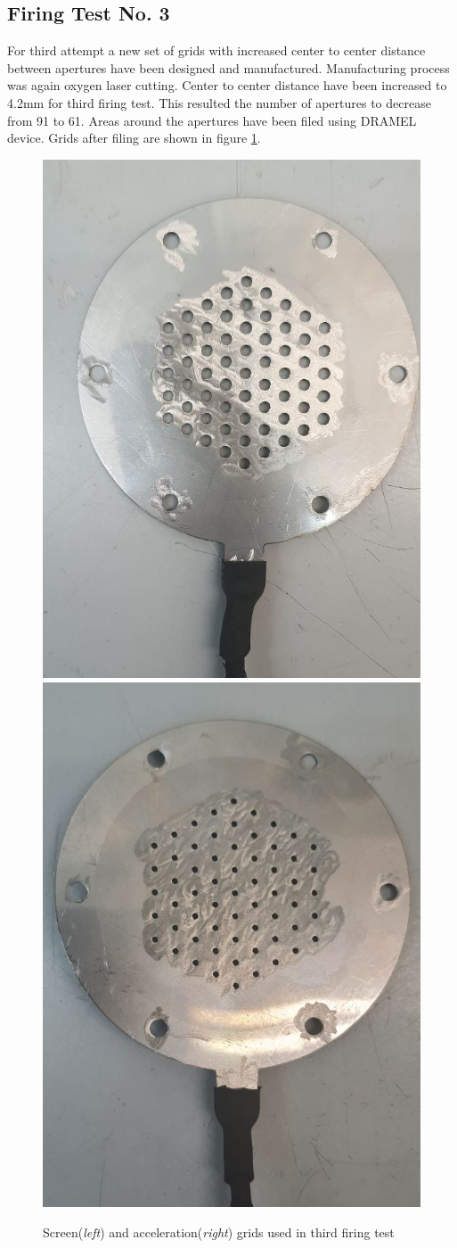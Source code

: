 \newpage
\subsection{Firing Test No. 3}
For third attempt a new set of grids with increased center to center distance between apertures have been designed and manufactured. Manufacturing process was again oxygen laser cutting. Center to center distance have been increased to 4.2mm for third firing test. This resulted the number of apertures to decrease from 91 to 61. Areas around the apertures have been filed using DRAMEL device. Grids after filing are shown in figure \ref{fig:3rd_grids_before}.

\begin{figure}[ht]
    \centering
    \includegraphics[width=0.41\linewidth]{fig/deneme3/test3_screen_before.jpeg}
    \includegraphics[width=0.4\linewidth]{fig/deneme3/test3_accel_before.jpeg}
    \caption{Screen(\textit{left}) and acceleration(\textit{right}) grids used in third firing test}
    \label{fig:3rd_grids_before}
\end{figure}

